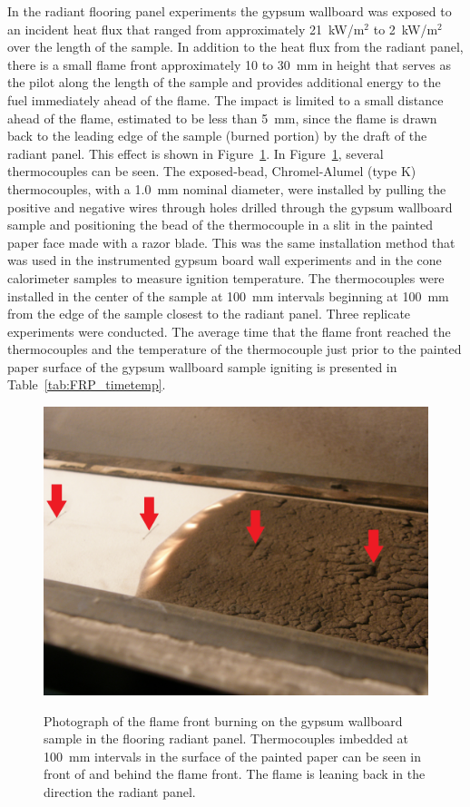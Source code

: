 \documentclass[twoside]{uocthesis}
\begin{document}
{In the radiant flooring panel experiments the gypsum wallboard was exposed to an incident heat flux that ranged from approximately 21~kW/m$^2$ to 2~kW/m$^2$ over the length of the sample. In addition to the heat flux from the radiant panel, there is a small flame front approximately 10 to 30~mm in height that serves as the pilot along the length of the sample and provides additional energy to the fuel immediately ahead of the flame.  The impact is limited to a small distance ahead of the flame, estimated to be less than 5~mm, since the flame is drawn back to the leading edge of the sample (burned portion) by the draft of the radiant panel.  This effect is shown in Figure~\ref{FRP_flamefront_arrows}. In Figure~\ref{FRP_flamefront_arrows}, several thermocouples can be seen. The exposed-bead, Chromel-Alumel (type K) thermocouples, with a 1.0~mm nominal diameter, were installed by pulling the positive and negative wires through holes drilled through the gypsum wallboard sample and positioning the bead of the thermocouple in a slit in the painted paper face made with a razor blade.  This was the same installation method that was used in the instrumented gypsum board wall experiments and in the cone calorimeter samples to measure ignition temperature.  The thermocouples were installed in the center of the sample at 100~mm intervals beginning at 100~mm from the edge of the sample closest to the radiant panel.  Three replicate experiments were conducted.  The average time that the flame front reached the thermocouples and the temperature of the thermocouple just prior to the painted paper surface of the gypsum wallboard sample igniting is presented in Table~\ref{tab:FRP_timetemp}.  

\begin{figure}
	\centering
	\includegraphics[width=\textwidth]{../Figures/FRP_flamefront_arrows} \\
	\caption[Photograph of the flame front burning on the gypsum wallboard sample in the flooring radiant panel] {Photograph of the flame front burning on the gypsum wallboard sample in the flooring radiant panel. Thermocouples imbedded at 100~mm intervals in the surface of the painted paper can be seen in front of and behind the flame front. The flame is leaning back in the direction the radiant panel.}
	\label{FRP_flamefront_arrows}
\end{figure}

}
\end{document}
